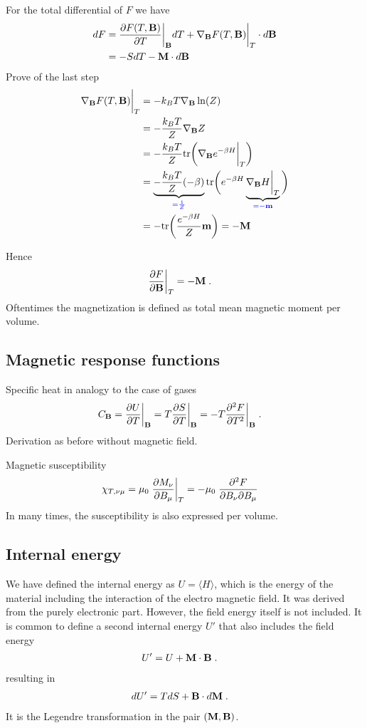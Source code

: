 For the total differential of $F$ we have
%
\begin{align*}
dF &= \frac{\partial F(T,\mathbf B)}{\partial T}\bigg|_{\mathbf B} dT + \nabla_{\mathbf B} F(T,\mathbf B)\bigg|_{T} \cdot d\mathbf B\\
&= - S dT - \mathbf M \cdot d\mathbf B
\end{align*}
%
Prove of the last step
%
\begin{align*}
 \nabla_{\mathbf B} F(T,\mathbf B)\bigg|_{T} &=-k_{B}T  \nabla_{\mathbf B} \ln(Z)\\
 &=-\frac{k_{B}T}{Z}  \nabla_{\mathbf B} Z\\
 &= -\frac{k_{B}T }{Z}\text{tr} \bigg(\nabla_{\mathbf B} e^{-\beta H}\bigg|_{T}\bigg) \\
  &= \underbrace{
-\frac{k_{B}T}{Z} (-\beta)
}_{\color{blue} = \frac{1}{Z}} \text{tr} \bigg(e^{-\beta H} \underbrace{
\nabla_{\mathbf B} H\bigg|_{T} 
}_{\color{blue} = -\mathbf m}\bigg)\\
&=- \text{tr} \bigg( \frac{e^{-\beta H}}{Z} \mathbf m\bigg) = -\mathbf M
\end{align*}
%

Hence
%
\begin{align}\label{eq:}
\frac{\partial F}{\partial \mathbf B}\bigg|_{T} &= -\mathbf M\;.
\end{align}
%
{\color{blue}Oftentimes the magnetization is defined as total mean magnetic moment per volume.}

\subsection{Magnetic response functions}

Specific heat in analogy to the  case of gases
%
\begin{align}
C_{\mathbf B} &= \frac{\partial U}{\partial T}\bigg|_{\mathbf B}  = T \frac{\partial S}{\partial T}\bigg|_{\mathbf B}
=-T\frac{\partial^{2} F}{\partial T^{2}} \bigg|_{\mathbf B}\;.
\end{align}
%
Derivation as before without magnetic field.

Magnetic susceptibility
%
\begin{align}
\chi_{T,\nu\mu} &=\mu_{0}\;\frac{\partial M_{\nu}}{\partial B_{\mu}}\bigg|_{T} =
- \mu_{0}\;\frac{\partial^{2} F}{\partial B_{\nu} \partial B_{\mu}}
\end{align}
%
{\color{blue}In many times, the susceptibility is also expressed per volume.}
\subsection{Internal energy}
We have defined the internal energy as $U=\langle H \rangle$, which is the energy of the material including the interaction of the electro magnetic field. 
It was derived from the purely electronic part.
However, the field energy itself is not included. It is common to define a second internal energy $U'$ that also includes the 
field energy
%
\begin{align}\label{eq:}
U' &= U + \mathbf M\cdot \mathbf B\;.
\end{align}
%
resulting in 
%
\begin{align*}
d U' &= T dS + \mathbf B\cdot d\mathbf M \;.
\end{align*}
%
It is the Legendre transformation in the pair $(\mathbf M,\mathbf B)$.

